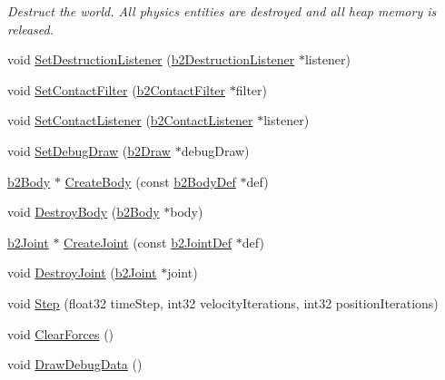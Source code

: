 \begin{DoxyCompactItemize}
\begin{DoxyCompactList}\small\item\em Destruct the world. All physics entities are destroyed and all heap memory is released. \end{DoxyCompactList}\item 
void \hyperlink{classb2_world_ae377f2dd5512ada7d27f4ad3541c75bf}{Set\+Destruction\+Listener} (\hyperlink{classb2_destruction_listener}{b2\+Destruction\+Listener} $\ast$listener)
\item 
void \hyperlink{classb2_world_a85e6e1e911c7d6366f8c7d57a12b72ff}{Set\+Contact\+Filter} (\hyperlink{classb2_contact_filter}{b2\+Contact\+Filter} $\ast$filter)
\item 
void \hyperlink{classb2_world_a614549967fb8a1584b61c11e2d553d42}{Set\+Contact\+Listener} (\hyperlink{classb2_contact_listener}{b2\+Contact\+Listener} $\ast$listener)
\item 
void \hyperlink{classb2_world_a6976d2c67400df03c0d44174ffcfb7ee}{Set\+Debug\+Draw} (\hyperlink{classb2_draw}{b2\+Draw} $\ast$debug\+Draw)
\item 
\hyperlink{classb2_body}{b2\+Body} $\ast$ \hyperlink{classb2_world_a9323d553e4c132b26d8741b457d7c034}{Create\+Body} (const \hyperlink{structb2_body_def}{b2\+Body\+Def} $\ast$def)
\item 
void \hyperlink{classb2_world_ad52231ad7a9556ef5735ac79cbcd8fcf}{Destroy\+Body} (\hyperlink{classb2_body}{b2\+Body} $\ast$body)
\item 
\hyperlink{classb2_joint}{b2\+Joint} $\ast$ \hyperlink{classb2_world_a8a408c367fe133530f3e577c667d1efd}{Create\+Joint} (const \hyperlink{structb2_joint_def}{b2\+Joint\+Def} $\ast$def)
\item 
void \hyperlink{classb2_world_add5942aef171e54cfa384c8975746dca}{Destroy\+Joint} (\hyperlink{classb2_joint}{b2\+Joint} $\ast$joint)
\item 
void \hyperlink{classb2_world_a7a8eff61af98461f978fe43f3af7be90}{Step} (float32 time\+Step, int32 velocity\+Iterations, int32 position\+Iterations)
\item 
void \hyperlink{classb2_world_ac082ab4c4ad0b1c5ec4674315eeec643}{Clear\+Forces} ()
\item 
void \hyperlink{classb2_world_a293d9865e407fd463e168b0a29856acc}{Draw\+Debug\+Data} ()\hypertarget{classb2_world_a293d9865e407fd463e168b0a29856acc}{}\label{classb2_world_a293d9865e407fd463e168b0a29856acc}


\end{DoxyCompactItemize}
